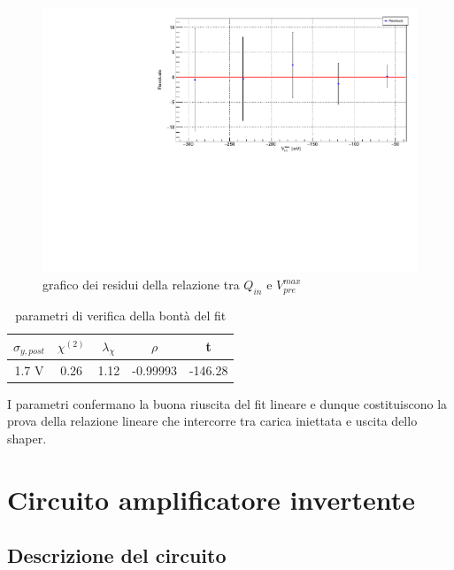 \documentclass{article}
\begin{document}
\begin{center}
    \begin{figure}[H]
    \centering
    \includegraphics[scale=0.375, angle=0]{residuishaper.pdf}
    \caption{grafico dei residui della relazione tra $Q_{in}$ e $V_{pre}^{max}$}
    \label{fig:residuishaper}
    \end{figure}
\end{center}

\begin{table}[ht]
    \centering
    \begin{tabular}{ccccc}
        \toprule
        $\sigma_{y, post}$    &$\chi^{(2)}$    &$\lambda_{\chi}$   &$\rho$  &t   \\
        \midrule
        1.7 V               &0.26            &1.12              &-0.99993&-146.28\\
        \bottomrule
    \end{tabular}
    \caption{parametri di verifica della bontà del fit}
\end{table}

I parametri confermano la buona riuscita del fit lineare e dunque costituiscono la prova della relazione lineare che intercorre tra
carica iniettata e uscita dello shaper.


\section{Circuito amplificatore invertente}

\subsection{Descrizione del circuito}
\end{document}
